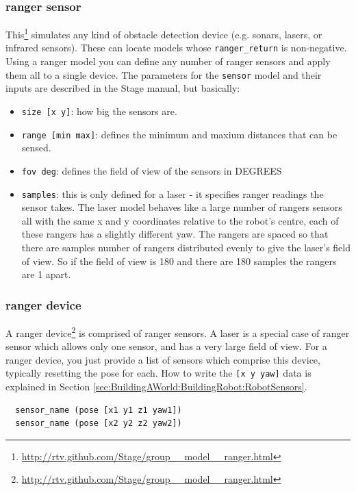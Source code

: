 \documentclass[a4paper]{report}
\begin{document}
\subsubsection{ranger sensor} \label{sec:BuildingAWorld:BuildingRobot:RobotSensors:Ranger}
This\footnote{\url{http://rtv.github.com/Stage/group__model__ranger.html}}
simulates any kind of obstacle detection device (e.g. sonars, lasers, or
infrared sensors). These can locate models whose {\tt ranger\_return} is
non-negative. Using a ranger model you can define any number of ranger
sensors and apply them all to a single device. The parameters for the
{\tt sensor} model and their inputs are described in the Stage manual, but
basically:
\begin{itemize} 
\item \verb|size [x y]|: how big the sensors are.
\item \verb|range [min max]|: defines the minimum and maxium distances that
can be sensed.
\item \verb|fov deg|: defines the field of view of the sensors in DEGREES
\item \verb|samples|: this is only defined for a laser - it specifies
      ranger readings the sensor takes. The laser model behaves like a
      large number of rangers sensors all with the same x and y coordinates
      relative to the robot's centre, each of these rangers has a slightly
      different yaw. The rangers are spaced so that there are samples
      number of rangers distributed evenly to give the laser's field of
      view. So if the field of view is 180 and there are 180 samples the
      rangers are 1 apart.
\end{itemize}

\subsubsection{ranger device}
A ranger device\footnote{\url{http://rtv.github.com/Stage/group__model__ranger.html}} is comprised of ranger sensors.  A laser is a special case
of ranger sensor which allows only one sensor, and has a very large field
of view.  For a ranger device, you just provide a list of sensors which
comprise this device, typically resetting the pose for each.  How to write
the \verb|[x y yaw]| data is explained in Section
\ref{sec:BuildingAWorld:BuildingRobot:RobotSensors}.
\begin{verbatim}
  sensor_name (pose [x1 y1 z1 yaw1])
  sensor_name (pose [x2 y2 z2 yaw2])
\end{verbatim}
\end{document}
